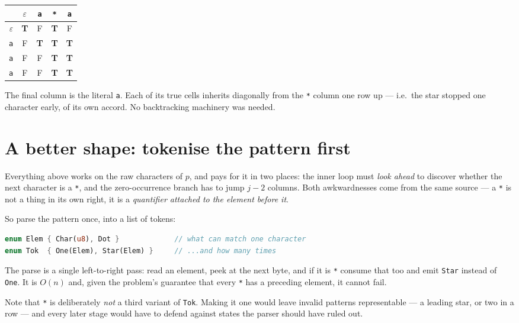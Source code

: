 \documentclass[11pt,a4paper]{article}
\newcommand{\T}{\cellcolor{truecell}\textbf{T}}
\newcommand{\F}{\cellcolor{falsecell}F}
\begin{document}
\begin{center}
\renewcommand{\arraystretch}{1.35}
\begin{tabular}{r|cccc}
  & $\varepsilon$ & \texttt{a} & \texttt{*} & \texttt{a}\\
  \midrule
  $\varepsilon$ & \T & \F & \T & \F\\
  \texttt{a}    & \F & \T & \T & \T\\
  \texttt{a}    & \F & \F & \T & \T\\
  \texttt{a}    & \F & \F & \T & \T\\
\end{tabular}
\end{center}

The final column is the literal \texttt{a}. Each of its true cells inherits diagonally from the
\texttt{*} column one row up --- i.e.\ the star stopped one character early, of its own accord.
No backtracking machinery was needed.

\section{A better shape: tokenise the pattern first}

Everything above works on the raw characters of $p$, and pays for it in two places: the inner loop
must \emph{look ahead} to discover whether the next character is a \texttt{*}, and the
zero-occurrence branch has to jump $j-2$ columns. Both awkwardnesses come from the same source ---
a \texttt{*} is not a thing in its own right, it is a \emph{quantifier attached to the element
before it}.

So parse the pattern once, into a list of tokens:

\begin{lstlisting}[language=Rust]
enum Elem { Char(u8), Dot }             // what can match one character
enum Tok  { One(Elem), Star(Elem) }     // ...and how many times
\end{lstlisting}

The parse is a single left-to-right pass: read an element, peek at the next byte, and if it is
\texttt{*} consume that too and emit \texttt{Star} instead of \texttt{One}. It is $O(n)$ and, given
the problem's guarantee that every \texttt{*} has a preceding element, it cannot fail.

Note that \texttt{*} is deliberately \emph{not} a third variant of \texttt{Tok}. Making it one
would leave invalid patterns representable --- a leading star, or two in a row --- and every later
stage would have to defend against states the parser should have ruled out.
\end{document}
